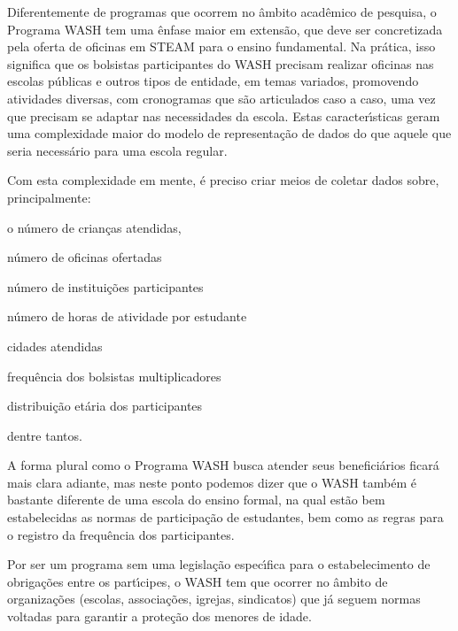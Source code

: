 \documentclass[
12pt,		%
openright,	%
twoside,  %
a4paper,			%
chapter=TITLE,		%
english,			%
french,				%
spanish,			%
brazil				%
]{USPSC-classe/USPSC}
\begin{document}
Diferentemente de programas que ocorrem no \^ambito acad\^emico de pesquisa, o Programa WASH tem uma \^enfase maior em extens\~ao, que deve ser concretizada pela oferta de oficinas em STEAM para o ensino fundamental. Na pr\'atica, isso significa que os bolsistas participantes do WASH precisam realizar oficinas nas escolas p\'ublicas e outros tipos de entidade, em temas variados, promovendo atividades diversas, com cronogramas que s\~ao articulados caso a caso, uma vez que precisam se adaptar nas necessidades da escola. Estas caracter\'{\i}sticas geram uma complexidade maior do modelo de representa\c{c}\~ao de dados do que aquele que seria necess\'ario para uma escola regular.




Com esta complexidade em mente, \'e preciso criar meios de coletar dados sobre, principalmente:





\begin{alineas}
\item o n\'umero de crian\c{c}as atendidas,
\item n\'umero de oficinas ofertadas
\item n\'umero de institui\c{c}\~oes participantes
\item n\'umero de horas de atividade por estudante
\item cidades atendidas
\item frequ\^encia dos bolsistas multiplicadores
\item distribui\c{c}\~ao et\'aria dos participantes
\end{alineas}

dentre tantos.




A forma plural como o Programa WASH busca atender seus benefici\'arios ficar\'a mais clara adiante, mas neste ponto podemos dizer que o WASH tamb\'em \'e bastante diferente de uma escola do ensino formal, na qual est\~ao bem estabelecidas as normas de participa\c{c}\~ao de estudantes, bem como as regras para o registro da frequ\^encia dos participantes.




Por ser um programa sem uma legisla\c{c}\~ao espec\'{\i}fica para o estabelecimento de obriga\c{c}\~oes entre os part\'{\i}cipes, o WASH tem que ocorrer no \^ambito de organiza\c{c}\~oes (escolas, associa\c{c}\~oes, igrejas, sindicatos) que j\'a seguem normas voltadas para garantir a prote\c{c}\~ao dos menores de idade.
\end{document}
